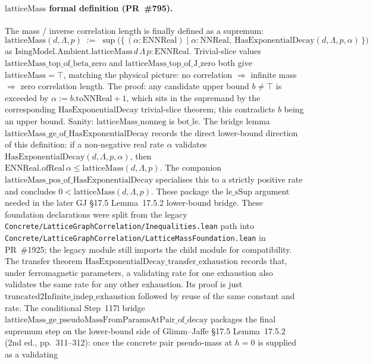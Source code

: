 \documentclass[a4paper,11pt]{article}
\begin{document}
\paragraph{$\mathrm{latticeMass}$ formal definition (PR~\#795).}
The mass / inverse correlation length is finally defined as a
supremum:
\[
  \mathrm{latticeMass}(d, \Lambda, p) \;:=\;
    \sup\bigl(\{\, (\alpha : \mathrm{ENNReal}) \mid \alpha : \mathrm{NNReal},\
       \mathrm{HasExponentialDecay}(d, \Lambda, p, \alpha) \,\}\bigr)
\]
as $\mathrm{IsingModel.Ambient.latticeMass}\,d\,\Lambda\,p :
\mathrm{ENNReal}$. Trivial-slice values
$\mathrm{latticeMass\_top\_of\_beta\_zero}$ and
$\mathrm{latticeMass\_top\_of\_J\_zero}$ both give
$\mathrm{latticeMass} = \top$, matching the physical picture:
no correlation $\Rightarrow$ infinite mass $\Rightarrow$ zero
correlation length. The proof: any candidate upper bound
$b \ne \top$ is exceeded by $\alpha := b.\mathrm{toNNReal} + 1$,
which sits in the supremand by the corresponding
$\mathrm{HasExponentialDecay}$ trivial-slice theorem; this
contradicts $b$ being an upper bound. Sanity:
$\mathrm{latticeMass\_nonneg}$ is $\mathrm{bot\_le}$.
The bridge lemma
$\mathrm{latticeMass\_ge\_of\_HasExponentialDecay}$ records the
direct lower-bound direction of this definition: if a non-negative
real rate $\alpha$ validates
$\mathrm{HasExponentialDecay}(d,\Lambda,p,\alpha)$, then
$\mathrm{ENNReal.ofReal}\,\alpha \le \mathrm{latticeMass}(d,\Lambda,p)$.
The companion $\mathrm{latticeMass\_pos\_of\_HasExponentialDecay}$
specialises this to a strictly positive rate and concludes
$0 < \mathrm{latticeMass}(d,\Lambda,p)$. These package the
$\mathrm{le\_sSup}$ argument needed in the later GJ \S17.5
Lemma~17.5.2 lower-bound bridge.
These foundation declarations were split from the legacy
\texttt{Concrete/LatticeGraphCorrelation/Inequalities.lean} path into
\texttt{Concrete/LatticeGraphCorrelation/LatticeMassFoundation.lean}
in PR~\#1925; the legacy module still imports the child module for
compatibility.
The transfer theorem
$\mathrm{HasExponentialDecay\_transfer\_exhaustion}$ records that,
under ferromagnetic parameters, a validating rate for one exhaustion
also validates the same rate for any other exhaustion. Its proof is
just $\mathrm{truncated2Infinite\_indep\_exhaustion}$ followed by
reuse of the same constant and rate.
The conditional Step~117l bridge
$\mathrm{latticeMass\_ge\_pseudoMassFromParamsAtPair\_of\_decay}$
packages the final supremum step on the lower-bound side of
Glimm--Jaffe \S17.5 Lemma~17.5.2 (2nd ed., pp.~311--312): once the
concrete pair pseudo-mass at $h=0$ is supplied as a validating
\end{document}
